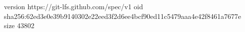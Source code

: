 version https://git-lfs.github.com/spec/v1
oid sha256:62ed3e0e39b9140302e22eed3f2d6ee4bcf90ed11c5479aaa4e42f8461a7677e
size 43802
